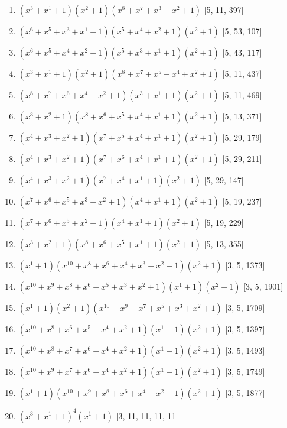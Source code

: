 \documentclass[10pt,twocolumn]{article}
\begin{document}
\begin{enumerate}
\item $(x^{3} + x^{1} + 1)(x^{2} + 1)(x^{8} + x^{7} + x^{3} + x^{2} + 1)$  [5, 11, 397]
\item $(x^{6} + x^{5} + x^{3} + x^{1} + 1)(x^{5} + x^{4} + x^{2} + 1)(x^{2} + 1)$  [5, 53, 107]
\item $(x^{6} + x^{5} + x^{4} + x^{2} + 1)(x^{5} + x^{3} + x^{1} + 1)(x^{2} + 1)$  [5, 43, 117]
\item $(x^{3} + x^{1} + 1)(x^{2} + 1)(x^{8} + x^{7} + x^{5} + x^{4} + x^{2} + 1)$  [5, 11, 437]
\item $(x^{8} + x^{7} + x^{6} + x^{4} + x^{2} + 1)(x^{3} + x^{1} + 1)(x^{2} + 1)$  [5, 11, 469]
\item $(x^{3} + x^{2} + 1)(x^{8} + x^{6} + x^{5} + x^{4} + x^{1} + 1)(x^{2} + 1)$  [5, 13, 371]
\item $(x^{4} + x^{3} + x^{2} + 1)(x^{7} + x^{5} + x^{4} + x^{1} + 1)(x^{2} + 1)$  [5, 29, 179]
\item $(x^{4} + x^{3} + x^{2} + 1)(x^{7} + x^{6} + x^{4} + x^{1} + 1)(x^{2} + 1)$  [5, 29, 211]
\item $(x^{4} + x^{3} + x^{2} + 1)(x^{7} + x^{4} + x^{1} + 1)(x^{2} + 1)$  [5, 29, 147]
\item $(x^{7} + x^{6} + x^{5} + x^{3} + x^{2} + 1)(x^{4} + x^{1} + 1)(x^{2} + 1)$  [5, 19, 237]
\item $(x^{7} + x^{6} + x^{5} + x^{2} + 1)(x^{4} + x^{1} + 1)(x^{2} + 1)$  [5, 19, 229]
\item $(x^{3} + x^{2} + 1)(x^{8} + x^{6} + x^{5} + x^{1} + 1)(x^{2} + 1)$  [5, 13, 355]
\item $(x^{1} + 1)(x^{10} + x^{8} + x^{6} + x^{4} + x^{3} + x^{2} + 1)(x^{2} + 1)$  [3, 5, 1373]
\item $(x^{10} + x^{9} + x^{8} + x^{6} + x^{5} + x^{3} + x^{2} + 1)(x^{1} + 1)(x^{2} + 1)$  [3, 5, 1901]
\item $(x^{1} + 1)(x^{2} + 1)(x^{10} + x^{9} + x^{7} + x^{5} + x^{3} + x^{2} + 1)$  [3, 5, 1709]
\item $(x^{10} + x^{8} + x^{6} + x^{5} + x^{4} + x^{2} + 1)(x^{1} + 1)(x^{2} + 1)$  [3, 5, 1397]
\item $(x^{10} + x^{8} + x^{7} + x^{6} + x^{4} + x^{2} + 1)(x^{1} + 1)(x^{2} + 1)$  [3, 5, 1493]
\item $(x^{10} + x^{9} + x^{7} + x^{6} + x^{4} + x^{2} + 1)(x^{1} + 1)(x^{2} + 1)$  [3, 5, 1749]
\item $(x^{1} + 1)(x^{10} + x^{9} + x^{8} + x^{6} + x^{4} + x^{2} + 1)(x^{2} + 1)$  [3, 5, 1877]
\item $(x^{3} + x^{1} + 1)^{4}(x^{1} + 1)$  [3, 11, 11, 11, 11]

\end{enumerate}
\end{document}
